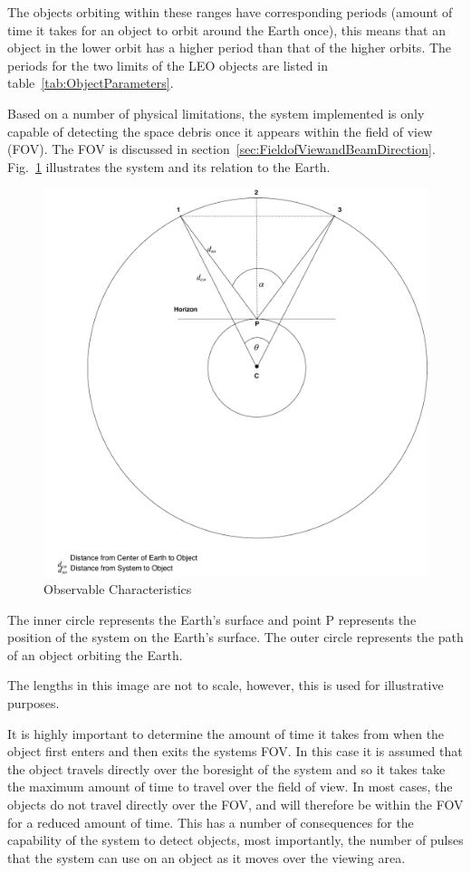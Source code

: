 \documentclass[11pt]{witseiepaper}
\begin{document}
\begin{bibunit}[witseie]
The objects orbiting within these ranges have corresponding periods (amount of time it takes for an object to orbit around the Earth once), this means that an object in the lower orbit has a higher period than that of the higher orbits. The periods for the two limits of the LEO objects are listed in table~\ref{tab:ObjectParameters}.

Based on a number of physical limitations, the system implemented is only capable of detecting the space debris once it appears within the field of view (FOV). The FOV is discussed in section~\ref{sec:FieldofViewandBeamDirection}. Fig.~\ref{fig:ObservableCharacteristics} illustrates the system and its relation to the Earth.


\begin{figure}[htb]
    \centering
    \includegraphics[width=0.5\linewidth]{ObservableCharacteristics.pdf}
    \caption{Observable Characteristics}
    \label{fig:ObservableCharacteristics}
\end{figure}


The inner circle represents the Earth's surface and point P represents the position of the system on the Earth's surface.  
The outer circle represents the path of an object orbiting the Earth.

The lengths in this image are not to scale, however, this is used for illustrative purposes.

It is highly important to determine the amount of time it takes from when the object first enters and then exits the systems FOV.
In this case it is assumed that the object travels directly over the boresight of the system and so it takes take the maximum amount of time to travel over the field of view. In most cases, the objects do not travel directly over the FOV, and will therefore be within the FOV for a reduced amount of time. This has a number of consequences for the capability of the system to detect objects, most importantly, the number of pulses that the system can use on an object as it moves over the viewing area.


\end{bibunit}
\end{document}
